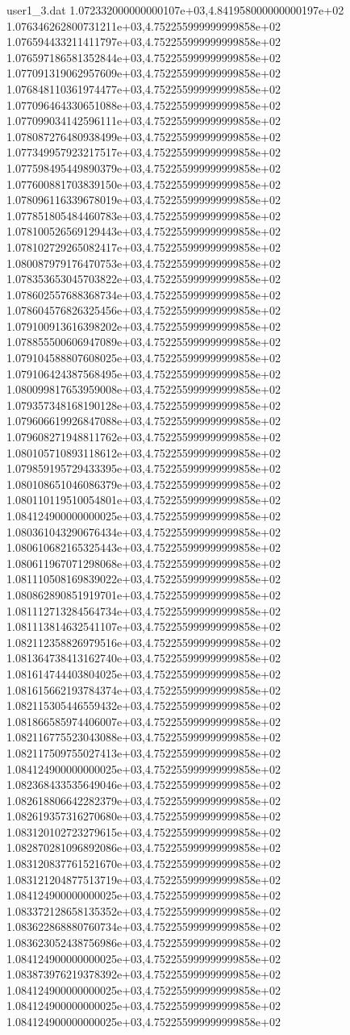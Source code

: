 \begin{filecontents}{user1_3.dat}
1.072332000000000107e+03,4.841958000000000197e+02
1.076346262800731211e+03,4.752255999999999858e+02
1.076594433211411797e+03,4.752255999999999858e+02
1.076597186581352844e+03,4.752255999999999858e+02
1.077091319062957609e+03,4.752255999999999858e+02
1.076848110361974477e+03,4.752255999999999858e+02
1.077096464330651088e+03,4.752255999999999858e+02
1.077099034142596111e+03,4.752255999999999858e+02
1.078087276480938499e+03,4.752255999999999858e+02
1.077349957923217517e+03,4.752255999999999858e+02
1.077598495449890379e+03,4.752255999999999858e+02
1.077600881703839150e+03,4.752255999999999858e+02
1.078096116339678019e+03,4.752255999999999858e+02
1.077851805484460783e+03,4.752255999999999858e+02
1.078100526569129443e+03,4.752255999999999858e+02
1.078102729265082417e+03,4.752255999999999858e+02
1.080087979176470753e+03,4.752255999999999858e+02
1.078353653045703822e+03,4.752255999999999858e+02
1.078602557688368734e+03,4.752255999999999858e+02
1.078604576826325456e+03,4.752255999999999858e+02
1.079100913616398202e+03,4.752255999999999858e+02
1.078855500606947089e+03,4.752255999999999858e+02
1.079104588807608025e+03,4.752255999999999858e+02
1.079106424387568495e+03,4.752255999999999858e+02
1.080099817653959008e+03,4.752255999999999858e+02
1.079357348168190128e+03,4.752255999999999858e+02
1.079606619926847088e+03,4.752255999999999858e+02
1.079608271948811762e+03,4.752255999999999858e+02
1.080105710893118612e+03,4.752255999999999858e+02
1.079859195729433395e+03,4.752255999999999858e+02
1.080108651046086379e+03,4.752255999999999858e+02
1.080110119510054801e+03,4.752255999999999858e+02
1.084124900000000025e+03,4.752255999999999858e+02
1.080361043290676434e+03,4.752255999999999858e+02
1.080610682165325443e+03,4.752255999999999858e+02
1.080611967071298068e+03,4.752255999999999858e+02
1.081110508169839022e+03,4.752255999999999858e+02
1.080862890851919701e+03,4.752255999999999858e+02
1.081112713284564734e+03,4.752255999999999858e+02
1.081113814632541107e+03,4.752255999999999858e+02
1.082112358826979516e+03,4.752255999999999858e+02
1.081364738413162740e+03,4.752255999999999858e+02
1.081614744403804025e+03,4.752255999999999858e+02
1.081615662193784374e+03,4.752255999999999858e+02
1.082115305446559432e+03,4.752255999999999858e+02
1.081866585974406007e+03,4.752255999999999858e+02
1.082116775523043088e+03,4.752255999999999858e+02
1.082117509755027413e+03,4.752255999999999858e+02
1.084124900000000025e+03,4.752255999999999858e+02
1.082368433535649046e+03,4.752255999999999858e+02
1.082618806642282379e+03,4.752255999999999858e+02
1.082619357316270680e+03,4.752255999999999858e+02
1.083120102723279615e+03,4.752255999999999858e+02
1.082870281096892086e+03,4.752255999999999858e+02
1.083120837761521670e+03,4.752255999999999858e+02
1.083121204877513719e+03,4.752255999999999858e+02
1.084124900000000025e+03,4.752255999999999858e+02
1.083372128658135352e+03,4.752255999999999858e+02
1.083622868880760734e+03,4.752255999999999858e+02
1.083623052438756986e+03,4.752255999999999858e+02
1.084124900000000025e+03,4.752255999999999858e+02
1.083873976219378392e+03,4.752255999999999858e+02
1.084124900000000025e+03,4.752255999999999858e+02
1.084124900000000025e+03,4.752255999999999858e+02
1.084124900000000025e+03,4.752255999999999858e+02
\end{filecontents}